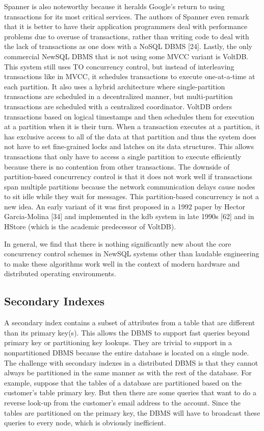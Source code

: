 \documentclass[a4paper,11pt,twoside,openright]{article}
\begin{document}
Spanner is also noteworthy because it heralds Google's return to using
transactions for its most critical services. The authors of Spanner even
remark that it is better to have their application programmers deal with
performance problems due to overuse of transactions, rather than writing
code to deal with the lack of transactions as one does with a NoSQL DBMS
{[}24{]}. Lastly, the only commercial NewSQL DBMS that is not using some
MVCC variant is VoltDB. This system still uses TO concurrency control,
but instead of interleaving transactions like in MVCC, it schedules
transactions to execute one-at-a-time at each partition. It also uses a
hybrid architecture where single-partition transactions are scheduled in
a decentralized manner, but multi-partition transactions are scheduled
with a centralized coordinator. VoltDB orders transactions based on
logical timestamps and then schedules them for execution at a partition
when it is their turn. When a transaction executes at a partition, it
has exclusive access to all of the data at that partition and thus the
system does not have to set fine-grained locks and latches on its data
structures. This allows transactions that only have to access a single
partition to execute efficiently because there is no contention from
other transactions. The downside of partition-based concurrency control
is that it does not work well if transactions span multiple partitions
because the network communication delays cause nodes to sit idle while
they wait for messages. This partition-based concurrency is not a new
idea. An early variant of it was first proposed in a 1992 paper by
Hector Garcia-Molina {[}34{]} and implemented in the kdb system in late
1990s {[}62{]} and in HStore (which is the academic predecessor of
VoltDB).

In general, we find that there is nothing significantly new about the
core concurrency control schemes in NewSQL systems other than laudable
engineering to make these algorithms work well in the context of modern
hardware and distributed operating environments.

\hypertarget{secondary-indexes}{%
\subsection{Secondary Indexes}\label{secondary-indexes}}

A secondary index contains a subset of attributes from a table that are
different than its primary key(s). This allows the DBMS to support fast
queries beyond primary key or partitioning key lookups. They are trivial
to support in a nonpartitioned DBMS because the entire database is
located on a single node. The challenge with secondary indexes in a
distributed DBMS is that they cannot always be partitioned in the same
manner as with the rest of the database. For example, suppose that the
tables of a database are partitioned based on the customer's table
primary key. But then there are some queries that want to do a reverse
look-up from the customer's email address to the account. Since the
tables are partitioned on the primary key, the DBMS will have to
broadcast these queries to every node, which is obviously inefficient.
\end{document}
